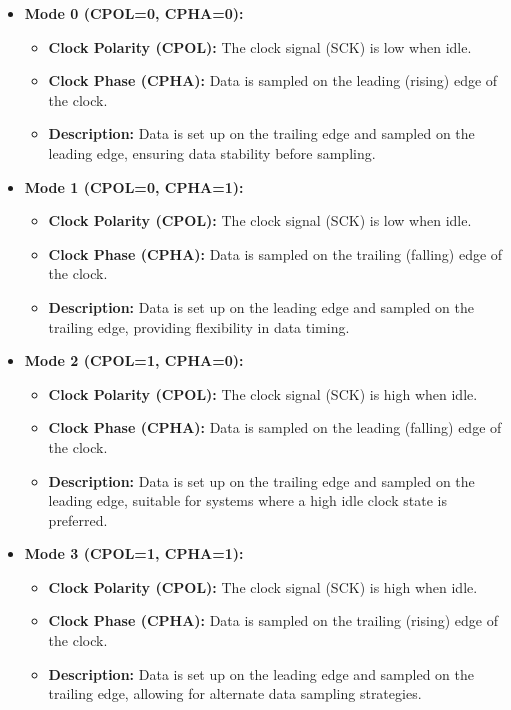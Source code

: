 \documentclass{article}
\begin{document}
\begin{itemize}
    \item \textbf{Mode 0 (CPOL=0, CPHA=0):} 
    \begin{itemize}
        \item \textbf{Clock Polarity (CPOL):} The clock signal (SCK) is low when idle.
        \item \textbf{Clock Phase (CPHA):} Data is sampled on the leading (rising) edge of the clock.
        \item \textbf{Description:} Data is set up on the trailing edge and sampled on the leading edge, ensuring data stability before sampling.
    \end{itemize}
     
    \item \textbf{Mode 1 (CPOL=0, CPHA=1):}
    \begin{itemize}
        \item \textbf{Clock Polarity (CPOL):} The clock signal (SCK) is low when idle.
        \item \textbf{Clock Phase (CPHA):} Data is sampled on the trailing (falling) edge of the clock.
        \item \textbf{Description:} Data is set up on the leading edge and sampled on the trailing edge, providing flexibility in data timing.
    \end{itemize}
    
    \item \textbf{Mode 2 (CPOL=1, CPHA=0):}
    \begin{itemize}
        \item \textbf{Clock Polarity (CPOL):} The clock signal (SCK) is high when idle.
        \item \textbf{Clock Phase (CPHA):} Data is sampled on the leading (falling) edge of the clock.
        \item \textbf{Description:} Data is set up on the trailing edge and sampled on the leading edge, suitable for systems where a high idle clock state is preferred.
    \end{itemize}
    
    \item \textbf{Mode 3 (CPOL=1, CPHA=1):}
    \begin{itemize}
        \item \textbf{Clock Polarity (CPOL):} The clock signal (SCK) is high when idle.
        \item \textbf{Clock Phase (CPHA):} Data is sampled on the trailing (rising) edge of the clock.
        \item \textbf{Description:} Data is set up on the leading edge and sampled on the trailing edge, allowing for alternate data sampling strategies.
    \end{itemize}
\end{itemize}
\end{document}
